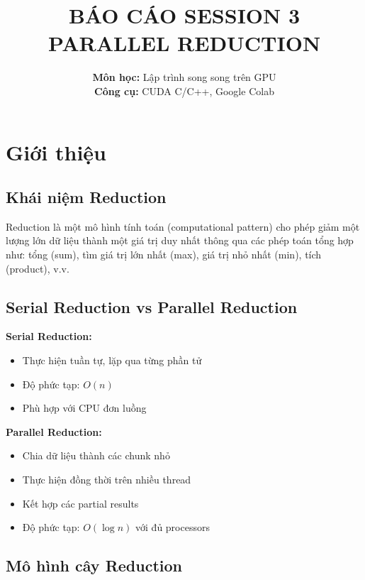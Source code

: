\documentclass[12pt,a4paper]{article}
\title{\textbf{BÁO CÁO SESSION 3\\PARALLEL REDUCTION}}
\author{
    \textbf{Môn học:} Lập trình song song trên GPU\\
    \textbf{Công cụ:} CUDA C/C++, Google Colab
}
\date{}
\begin{document}
\maketitle
\thispagestyle{empty}

\tableofcontents
\newpage

\section{Giới thiệu}

\subsection{Khái niệm Reduction}

Reduction là một mô hình tính toán (computational pattern) cho phép giảm một lượng lớn dữ liệu thành một giá trị duy nhất thông qua các phép toán tổng hợp như: tổng (sum), tìm giá trị lớn nhất (max), giá trị nhỏ nhất (min), tích (product), v.v.

\subsection{Serial Reduction vs Parallel Reduction}

\textbf{Serial Reduction:}
\begin{itemize}
    \item Thực hiện tuần tự, lặp qua từng phần tử
    \item Độ phức tạp: $O(n)$
    \item Phù hợp với CPU đơn luồng
\end{itemize}

\textbf{Parallel Reduction:}
\begin{itemize}
    \item Chia dữ liệu thành các chunk nhỏ
    \item Thực hiện đồng thời trên nhiều thread
    \item Kết hợp các partial results
    \item Độ phức tạp: $O(\log n)$ với đủ processors
\end{itemize}

\subsection{Mô hình cây Reduction}
\end{document}
